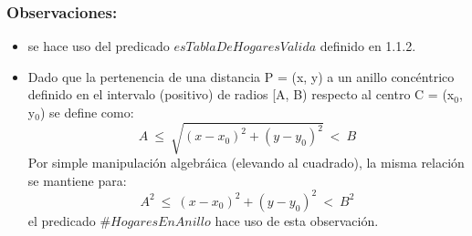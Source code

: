     \subsubsection{Observaciones:}
        \begin{itemize}
            \item se hace uso del predicado $esTablaDeHogaresValida$ definido en 1.1.2.
            \item Dado que la pertenencia de una distancia P = (x, y) a un anillo concéntrico definido en el intervalo (positivo) de radios [A, B) respecto al centro C = (x$_{0}$, y$_{0}$) se define como: 
                \begin{equation}
                    A\ \leq\ \sqrt{(x - x_{0})^{2} + (y - y_{0})^{2}}\ <\ B
                \end{equation}
                Por simple manipulación algebráica (elevando al cuadrado), la misma relación se mantiene para:
                \begin{equation}
                    A^{2}\ \leq\ (x - x_{0})^{2} + (y - y_{0})^{2}\ <\ B^{2}
                \end{equation}
                el predicado $\#HogaresEnAnillo$ hace uso de esta observaci\'on.
                
        \end{itemize}